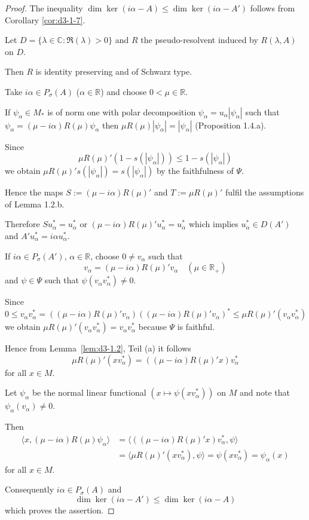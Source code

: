 \begin{proof}
The inequality $\dim \ker(i\alpha - A) \leq \dim \ker(i\alpha - A')$ follows from Corollary \ref{cor:d3-1-7}.

Let $D = \{\lambda \in \mathbb{C} : \Re(\lambda) > 0\}$ and $R$ the pseudo-resolvent induced by $R(\lambda,A)$ on $D$.

Then $R$ is identity preserving and of Schwarz type.

Take $i\alpha \in P_{\sigma}(A)$ ($\alpha \in \mathbb{R}$) and choose $0 < \mu \in \mathbb{R}$.

If $\psi_{\alpha} \in M_{*}$ is of norm one with polar decomposition $\psi_{\alpha} = u_{\alpha}|\psi_{\alpha}|$ such that $\psi_{\alpha} = (\mu - i\alpha)R(\mu)\psi_{\alpha}$ then $\mu R(\mu)|\psi_{\alpha}| = |\psi_{\alpha}|$ (Proposition 1.4.a).

Since
\[
\mu R(\mu)'(1 - s(|\psi_{\alpha}|)) \leq 1 - s(|\psi_{\alpha}|)
\]
we obtain $\mu R(\mu)'s(|\psi_{\alpha}|) = s(|\psi_{\alpha}|)$ by the faithfulness of $\Psi$.

Hence the maps $S := (\mu - i\alpha)R(\mu)'$ and $T := \mu R(\mu)'$ fulfil the assumptions of Lemma 1.2.b.

Therefore $Su_{\alpha}^{*} = u_{\alpha}^{*}$ or $(\mu-i\alpha)R(\mu)'u_{\alpha}^{*} = u_{\alpha}^{*}$ which implies $u_{\alpha}^{*} \in D(A')$ and $A'u_{\alpha}^{*} = i\alpha u_{\alpha}^{*}$.

If $i\alpha \in P_{\sigma}(A')$, $\alpha \in \mathbb{R}$, choose $0 \neq v_{\alpha}$ such that
\[
v_{\alpha} = (\mu - i\alpha)R(\mu)'v_{\alpha} \quad (\mu \in \mathbb{R}_{+})
\]
and $\psi \in \Psi$ such that $\psi(v_{\alpha}v_{\alpha}^{*}) \neq 0$.

Since
\[
0 \leq v_{\alpha}v_{\alpha}^{*} = ((\mu - i\alpha)R(\mu)'v_{\alpha})((\mu - i\alpha)R(\mu)'v_{\alpha})^{*} \leq \mu R(\mu)'(v_{\alpha}v_{\alpha}^{*})
\]
we obtain $\mu R(\mu)'(v_{\alpha}v_{\alpha}^{*}) = v_{\alpha}v_{\alpha}^{*}$ because $\Psi$ is faithful.


Hence from Lemma~\ref{lem:d3-1.2}, Teil (a) it follows
\[
\mu R(\mu)'(xv_{\alpha}^{*}) = ((\mu - i\alpha)R(\mu)'x)v_{\alpha}^{*}
\]
for all $x \in M$.

Let $\psi_{\alpha}$ be the normal linear functional $(x \mapsto \psi(xv_{\alpha}^{*}))$ on $M$ and note that $\psi_{\alpha}(v_{\alpha}) \neq 0$.

Then
\begin{align*}
\langle x, (\mu - i\alpha)R(\mu)\psi_{\alpha} \rangle &= \langle ((\mu - i\alpha)R(\mu)'x)v_{\alpha}^{*},\psi \rangle \\
&= \langle \mu R(\mu)'(xv_{\alpha}^{*}),\psi \rangle = \psi(xv_{\alpha}^{*}) = \psi_{\alpha}(x)
\end{align*}
for all $x \in M$.

Consequently $i\alpha \in P_{\sigma}(A)$ and
\[
\dim \ker(i\alpha - A') \leq \dim \ker(i\alpha - A)
\]
which proves the assertion.
\end{proof}

